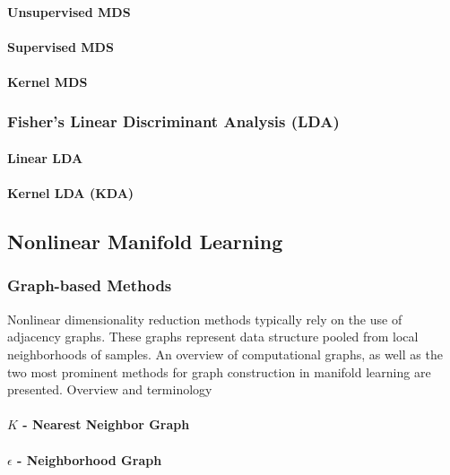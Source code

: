 \paragraph{Unsupervised MDS}

\paragraph{Supervised MDS}

\paragraph{Kernel MDS}

\subsubsection{Fisher's Linear Discriminant Analysis (LDA)}

\paragraph{Linear LDA}

\paragraph{Kernel LDA (KDA)}

\subsection{Nonlinear Manifold Learning}

\subsubsection{Graph-based Methods}
Nonlinear dimensionality reduction methods typically rely on the use of adjacency graphs.  These graphs represent data structure pooled from local neighborhoods of samples.  An overview of computational graphs, as well as the two most prominent methods for graph construction in manifold learning are presented.
Overview and terminology

\paragraph{$K$ - Nearest Neighbor Graph}

\paragraph{$\epsilon$ - Neighborhood Graph}

